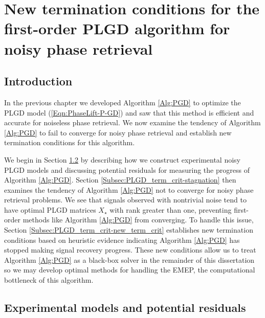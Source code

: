 \chapter{New termination conditions for the first-order PLGD algorithm for noisy phase retrieval}  \label{Sec:PLGD_term_crit}


\section{Introduction}	\label{Subsec:PLGD_term_crit-intro}


In the previous chapter we developed Algorithm \ref{Alg:PGD} to optimize the PLGD model (\ref{Eqn:PhaseLift-P-GD}) and saw that this method is efficient and accurate for noiseless phase retrieval.  We now examine the tendency of Algorithm \ref{Alg:PGD} to fail to converge for noisy phase retrieval and establish new termination conditions for this algorithm.

We begin in Section \ref{Subsec:PLGD_term_crit-NOISY_MODELS_AND_RESIDUALS} by describing how we construct experimental noisy PLGD models and discussing potential residuals for measuring the progress of Algorithm \ref{Alg:PGD}.
Section \ref{Subsec:PLGD_term_crit-stagnation} then examines the tendency of Algorithm \ref{Alg:PGD} not to converge for noisy phase retrieval problems.
We see that signals observed with nontrivial noise tend to have optimal PLGD matrices $X_\star$ with rank greater than one, preventing first-order methods like Algorithm \ref{Alg:PGD} from converging.  
To handle this issue, Section \ref{Subsec:PLGD_term_crit-new_term_crit} establishes new termination conditions based on heuristic evidence indicating Algorithm \ref{Alg:PGD} has stopped making signal recovery progress.  
These new conditions allow us to treat Algorithm \ref{Alg:PGD} as a black-box solver in the remainder of this dissertation so we may develop optimal methods for handling the EMEP, the computational bottleneck of this algorithm.







\section{Experimental models and potential residuals} 		\label{Subsec:PLGD_term_crit-NOISY_MODELS_AND_RESIDUALS}




